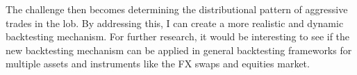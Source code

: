 The challenge then becomes determining the distributional pattern of aggressive trades in the \gls{lob}. By addressing this, I can create a more realistic and dynamic backtesting mechanism. For further research, it would be interesting to see if the new backtesting mechanism can be applied in general backtesting frameworks for multiple assets and instruments like the FX swaps and equities market.

